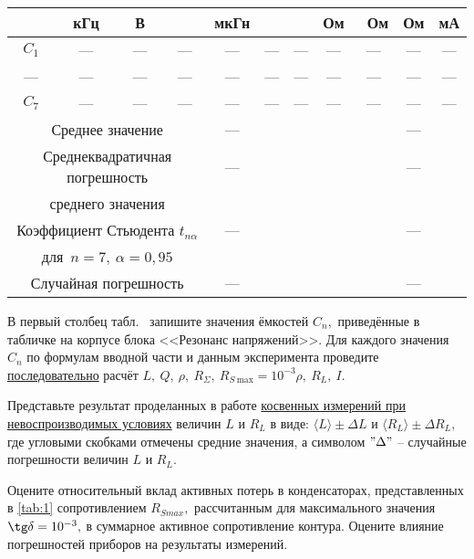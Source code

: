 \begin{lab:task}
\begin{enumerate}
\begin{center}
\begin{table}[tb!]
\begin{center}
\begin{tabular}{|c|c|c|c|c|c|c|c|c|c|c|}
		                     & кГц & В & & мкГн &  &  & Ом & ~Ом & Ом & мА \\
		                    \hline
		                    $C_1$ & {---} & --- & --- & --- & --- & --- & --- & --- & --- & --- \\
		                    \hline
		                    --- & --- & --- & --- & --- & --- & --- & --- & --- & ---& ---\\
		                    \hline
		                    $C_7$& --- & --- & --- & --- & --- & --- & ---& --- &--- &---\\
		                    \hline
		                    \multicolumn{4}{|c|}{ Среднее значение} & --- & & & & &---& \\
		                    \hline
		                    \multicolumn{4}{|c|}{ Среднеквадратичная погрешность } & ---& & & & &---& \\\multicolumn{4}{|c|}{  среднего значения} &  & & & & && \\
		                    \hline
		                    \multicolumn{4}{|c|}{ Коэффициент Стьюдента $t_{n\alpha}$ } & ---& & & & &---& \\\multicolumn{4}{|c|}{для~$n=7,~\alpha=0,95$} &  & & & & && \\
		                    \hline
		                    \multicolumn{4}{|c|}{ Случайная погрешность } & ---& & & & &---&\\
		
		                    \hline
		                \end{tabular}
		            \end{center}
		        \end{table}
		    \end{center}
		
		\par
		В первый столбец табл.~ запишите значения ёмкостей $C_n,$ приведённые в табличке на корпусе блока <<Резонанс напряжений>>. Для каждого значения $C_n$ по формулам вводной части и данным эксперимента проведите \underline{последовательно} расчёт $L,~Q,~\rho,~R_{\Sigma},~R_{S~\text{max}}=10^{-3}\rho,~R_L,~I.$
		\par
		Представьте результат проделанных в работе \underline{косвенных измерений при невоспроизводимых условиях} величин $L$ и $R_L$ в виде: $\langle L\rangle\pm\Delta L$ и $\langle R_L\rangle\pm\Delta R_L,$ где угловыми скобками отмечены средние значения, а символом $"\Delta"$ – случайные погрешности величин $L$ и $R_L.$
		\par
		Оцените относительный вклад активных потерь в конденсаторах, представленных в \eqref{tab:1} сопротивлением $R_{S{max}},$ рассчитанным для максимального значения $\tg\delta=10^{-3},$ в суммарное активное сопротивление контура. Оцените влияние погрешностей приборов на результаты измерений.


\end{enumerate}
\end{lab:task}
